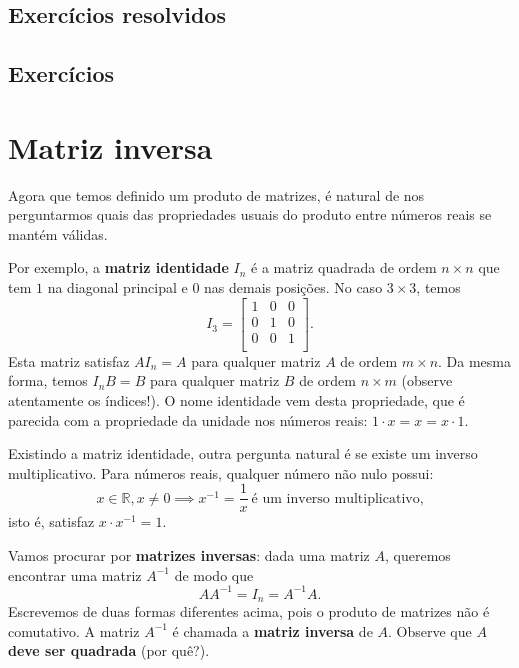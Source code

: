 \documentclass[../livro.tex]{subfiles}  %
\begin{document}
\subsection*{Exercícios resolvidos}

\construirExeresol

\subsection*{Exercícios}

\construirExer

\section{Matriz inversa}

Agora que temos definido um produto de matrizes, é natural de nos perguntarmos quais das propriedades usuais do produto entre números reais se mantém válidas.

Por exemplo, a \textbf{matriz identidade} $I_n$ é a matriz quadrada de ordem $n \times n$ que tem $1$ na diagonal principal e $0$ nas demais posições. No caso $3 \times 3$, temos
\begin{equation}
I_3 =
\left[
\begin{array}{ccc}
1 & 0 & 0 \\
0 & 1 & 0 \\
0 & 0 & 1 \\
\end{array}
\right].
\end{equation} Esta matriz satisfaz $A I_n = A$ para qualquer matriz $A$ de ordem $m \times n$. Da mesma forma, temos $I_n B = B$ para qualquer matriz $B$ de ordem $n \times m$ (observe atentamente os índices!). O nome identidade vem desta propriedade, que é parecida com a propriedade da unidade nos números reais: $1\cdot x = x = x\cdot 1$.

Existindo a matriz identidade, outra pergunta natural é se existe um inverso multiplicativo. Para números reais, qualquer número não nulo possui:
\begin{equation}
x \in \mathbb{R}, x \neq 0 \implies x^{-1} = \frac{1}{x} \ \text{é um inverso multiplicativo,}
\end{equation} isto é, satisfaz $x\cdot x^{-1} = 1$.

Vamos procurar por \textbf{matrizes inversas}: dada uma matriz $A$, queremos encontrar uma matriz $A^{-1}$ de modo que
\begin{equation}
A A^{-1} = I_n = A^{-1} A.
\end{equation} Escrevemos de duas formas diferentes acima, pois o produto de matrizes não é comutativo. A matriz $A^{-1}$ é chamada a \textbf{matriz inversa} de $A$. Observe que  \textbf{$A$ deve ser quadrada} (por quê?).
\end{document}
